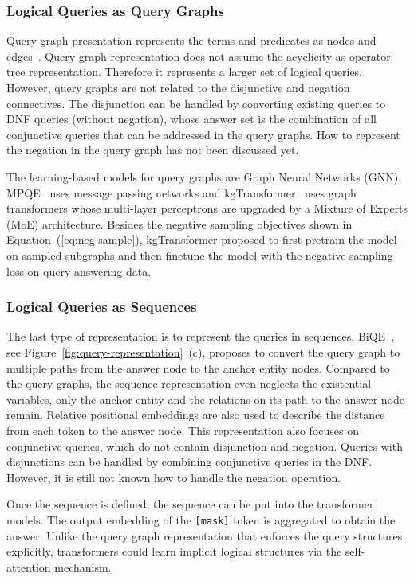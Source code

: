 \documentclass[11pt]{article}
\begin{document}
\subsubsection{Logical Queries as Query Graphs}
Query graph presentation represents the terms and predicates as nodes and edges~\cite{Daza2020MessagePassing,Liu2022MaskReason}. Query graph representation does not assume the acyclicity as operator tree representation. Therefore it represents a larger set of logical queries. However, query graphs are not related to the disjunctive and negation connectives. The disjunction can be handled by converting existing queries to DNF queries (without negation), whose answer set is the combination of all conjunctive queries that can be addressed in the query graphs. How to represent the negation in the query graph has not been discussed yet.

The learning-based models for query graphs are Graph Neural Networks (GNN). MPQE~\cite{Daza2020MessagePassing} uses message passing networks and kgTransformer~\cite{Liu2022MaskReason} uses graph transformers whose multi-layer perceptrons are upgraded by a Mixture of Experts (MoE) architecture. Besides the negative sampling objectives shown in Equation~(\ref{eq:neg-sample}), kgTransformer proposed to first pretrain the model on sampled subgraphs and then finetune the model with the negative sampling loss on query answering data.

\subsubsection{Logical Queries as Sequences}
The last type of representation is to represent the queries in sequences. BiQE~\cite{Kotnis2021AnsweringComplex}, see Figure~\ref{fig:query-representation}~(c), proposes to convert the query graph to multiple paths from the answer node to the anchor entity nodes. Compared to the query graphs, the sequence representation even neglects the existential variables, only the anchor entity and the relations on its path to the answer node remain. Relative positional embeddings are also used to describe the distance from each token to the answer node. This representation also focuses on conjunctive queries, which do not contain disjunction and negation. Queries with disjunctions can be handled by combining conjunctive queries in the DNF. However, it is still not known how to handle the negation operation.

Once the sequence is defined, the sequence can be put into the transformer models. The output embedding of the \texttt{[mask]} token is aggregated to obtain the answer. Unlike the query graph representation that enforces the query structures explicitly, transformers could learn implicit logical structures via the self-attention mechanism.
\end{document}
